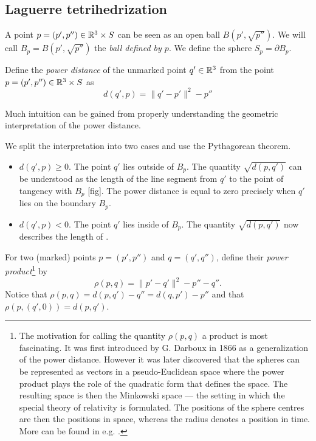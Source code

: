 



\subsection{Laguerre tetrihedrization}
A point $p=(p',p'')\in {\mathbb R^3}\times S$ can be seen as an open ball $B(p',\sqrt{p''})$. We will call $B_p = B(p',\sqrt{p''})$ the \textit{ball defined by $p$}. We define the sphere $S_p=\partial B_p$. 


\begin{definition}
	Define the \textit{power distance} of the unmarked point $q'\in {\mathbb R^3}$ from the point $p=(p',p'')\in{\mathbb R^3}\times S$ as
$$d(q',p) = \|q'-p'\|^2 - p''$$
\end{definition}
Much intuition can be gained from properly understanding the geometric interpretation of the power distance.

\begin{remark}
We split the interpretation into two cases and use the Pythagorean theorem.
\begin{itemize}
	\item $d(q',p) \geq 0$. The point $q'$ lies outside of $B_p$. The quantity $\sqrt{d(p,q')}$ can be understood as the length of the line segment from $q'$ to the point of tangency with $B_p$ [fig]. The power distance is equal to zero precisely when $q'$ lies on the boundary $B_p$.
	\item $d(q',p) < 0$. The point $q'$ lies inside of $B_p$. The quantity $\sqrt{d(p,q')}$ now describes the length of . 
\end{itemize}
\end{remark}

\begin{definition}
	For two (marked) points $p=(p',p'')$ and $q=(q',q'')$, define their \textit{power product}\footnote{ The motivation for calling the quantity $\rho(p,q)$ a product is most fascinating. It was first introduced by G. Darboux in 1866 as a generalization of the power distance. However it was later discovered that the spheres can be represented as vectors in a pseudo-Euclidean space where the power product plays the role of the quadratic form that defines the space. The resulting space is then the Minkowski space --- the setting in which the special theory of relativity is formulated. The positions of the sphere centres are then the positions in space, whereas the radius denotes a position in time. More can be found in e.g. \cite{Kocik2007}.} by 
$$\rho(p,q) = \|p'-q'\|^2 - p'' - q''.$$
Notice that $\rho(p,q) = d(p,q') - q'' = d(q,p') - p''$ and that $\rho(p,(q',0)) = d(p,q')$.
\end{definition}

